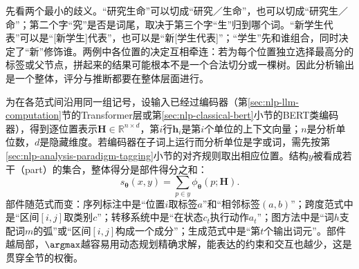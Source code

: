 先看两个最小的歧义。“研究生命”可以切成“研究／生命”，也可以切成“研究生／命”；第二个字“究”是否是词尾，取决于第三个字“生”归到哪个词。“新学生代表”可以是“[新学生]代表”，也可以是“新[学生代表]”；“学生”先和谁组合，同时决定了“新”修饰谁。两例中各位置的决定互相牵连：若为每个位置独立选择最高分的标签或父节点，拼起来的结果可能根本不是一个合法切分或一棵树。因此分析输出是一个整体，评分与推断都要在整体层面进行。

为在各范式间沿用同一组记号，设输入已经过编码器（第\ref{sec:nlp-llm-computation}节的Transformer层或第\ref{sec:nlp-classical-bert}小节的BERT类编码器），得到逐位置表示$\bm H\in\mathbb R^{n\times d}$，第$i$行$\bm h_i$是第$i$个单位的上下文向量；$n$是分析单位数，$d$是隐藏维度。若编码器在子词上运行而分析单位是字或词，需先按第\ref{sec:nlp-analysis-paradigm-tagging}小节的对齐规则取出相应位置。结构$y$被看成若干（part）的集合，整体得分是部件得分之和：
\begin{equation}
  s_{\bm\theta}(x,y)=\sum_{p\in y}\phi_{\bm\theta}(p;\bm H).
  \label{eq:nlp-analysis-part-score}
\end{equation}
部件随范式而变：序列标注中是“位置$i$取标签$a$”和“相邻标签$(a,b)$”；跨度范式中是“区间$[i,j]$取类别$c$”；转移系统中是“在状态$c_t$执行动作$a_t$”；图方法中是“词$h$支配词$m$的弧”或“区间$[i,j]$构成一个成分”；生成范式中是“第$t$个输出词元”。部件越局部，$\argmax$越容易用动态规划精确求解，能表达的约束和交互也越少，这是贯穿全节的权衡。

